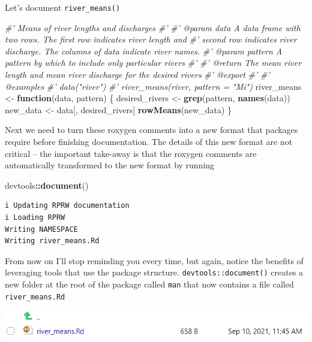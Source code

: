\documentclass[
]{book}
\newenvironment{Shaded}{\begin{snugshade}}{\end{snugshade}}
\newcommand{\CommentTok}[1]{\textcolor[rgb]{0.56,0.35,0.01}{\textit{#1}}}
\newcommand{\ControlFlowTok}[1]{\textcolor[rgb]{0.13,0.29,0.53}{\textbf{#1}}}
\newcommand{\KeywordTok}[1]{\textcolor[rgb]{0.13,0.29,0.53}{\textbf{#1}}}
\newcommand{\NormalTok}[1]{#1}
\newcommand{\OperatorTok}[1]{\textcolor[rgb]{0.81,0.36,0.00}{\textbf{#1}}}
\newcommand{\StringTok}[1]{\textcolor[rgb]{0.31,0.60,0.02}{#1}}
\begin{document}
Let's document \texttt{river\_means()}

\begin{Shaded}
\begin{Highlighting}[]
\CommentTok{#' Means of river lengths and discharges}
\CommentTok{#'}
\CommentTok{#' @param data A data frame with two rows. The first row indicates river length and}
\CommentTok{#'   second row indicates river discharge. The columns of data indicate river names.}
\CommentTok{#' @param pattern A pattern by which to include only particular rivers}
\CommentTok{#'}
\CommentTok{#' @return The mean river length and mean river discharge for the desired rivers}
\CommentTok{#' @export}
\CommentTok{#'}
\CommentTok{#' @examples}
\CommentTok{#' data("river")}
\CommentTok{#' river_means(river, pattern = "Mi")}
\NormalTok{river_means <-}\StringTok{ }\ControlFlowTok{function}\NormalTok{(data, pattern) \{}
\NormalTok{  desired_rivers <-}\StringTok{ }\KeywordTok{grep}\NormalTok{(pattern, }\KeywordTok{names}\NormalTok{(data))}
\NormalTok{  new_data <-}\StringTok{ }\NormalTok{data[, desired_rivers]}
  \KeywordTok{rowMeans}\NormalTok{(new_data)}
\NormalTok{\}}
\end{Highlighting}
\end{Shaded}

Next we need to turn these roxygen comments into a new format that packages require before finishing documentation. The details of this new format are not critical -- the important take-away is that the roxygen comments are automatically transformed to the new format by running

\begin{Shaded}
\begin{Highlighting}[]
\NormalTok{devtools}\OperatorTok{::}\KeywordTok{document}\NormalTok{()}
\end{Highlighting}
\end{Shaded}

\begin{verbatim}
i Updating RPRW documentation
i Loading RPRW
Writing NAMESPACE
Writing river_means.Rd
\end{verbatim}

From now on I'll stop reminding you every time, but again, notice the benefits of leveraging tools that use the package structure. \texttt{devtools::document()} creates a new folder at the root of the package called \texttt{man} that now contains a file called \texttt{river\_means.Rd}

\includegraphics[width=1\linewidth]{images/newrpack_files2}
\end{document}
